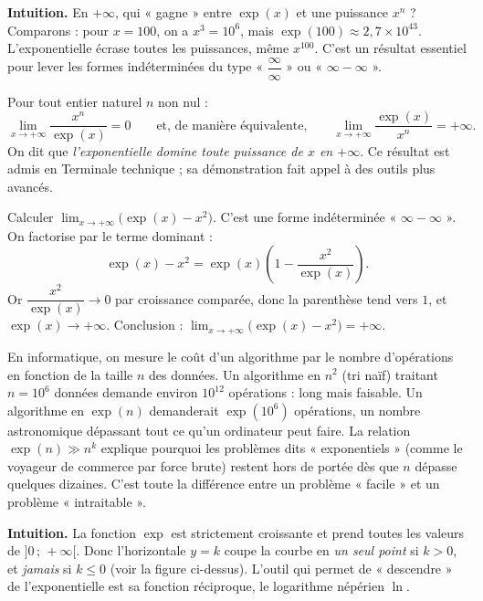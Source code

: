 \documentclass[11pt]{article}
\newcounter{popsec}
\newcounter{popsub}
\newcommand{\courssub}[1]{%
  \stepcounter{popsub}%
  \par\vspace{9pt}\noindent{\popxbold\fontsize{11.5}{13}\selectfont\color{popink}{\color{poporange}\thepopsec.\thepopsub}\hspace{6pt}#1}\par\nopagebreak\vspace{4pt}
}
\begin{document}
\textbf{Intuition.} En $+\infty$, qui « gagne » entre $\exp(x)$ et une puissance $x^n$ ? Comparons : pour $x = 100$, on a $x^3 = 10^{6}$, mais $\exp(100) \approx 2,7 \times 10^{43}$. L'exponentielle écrase toutes les puissances, même $x^{100}$. C'est un résultat essentiel pour lever les formes indéterminées du type « $\dfrac{\infty}{\infty}$ » ou « $\infty - \infty$ ».

\begin{propriete}
Pour tout entier naturel $n$ non nul :
\[
\lim_{x \to +\infty} \frac{x^n}{\exp(x)} = 0 \qquad \text{et, de manière équivalente,} \qquad \lim_{x \to +\infty} \frac{\exp(x)}{x^n} = +\infty.
\]
On dit que \emph{l'exponentielle domine toute puissance de $x$ en $+\infty$}. Ce résultat est admis en Terminale technique ; sa démonstration fait appel à des outils plus avancés.
\end{propriete}

\begin{exemplebox}
Calculer $\displaystyle\lim_{x \to +\infty} \bigl(\exp(x) - x^2\bigr)$. C'est une forme indéterminée « $\infty - \infty$ ». On factorise par le terme dominant :
\[
\exp(x) - x^2 = \exp(x)\left(1 - \frac{x^2}{\exp(x)}\right).
\]
Or $\dfrac{x^2}{\exp(x)} \to 0$ par croissance comparée, donc la parenthèse tend vers $1$, et $\exp(x) \to +\infty$. Conclusion : $\displaystyle\lim_{x \to +\infty} \bigl(\exp(x) - x^2\bigr) = +\infty$.
\end{exemplebox}

\begin{savaistu}
En informatique, on mesure le coût d'un algorithme par le nombre d'opérations en fonction de la taille $n$ des données. Un algorithme en $n^2$ (tri naïf) traitant $n = 10^{6}$ données demande environ $10^{12}$ opérations : long mais faisable. Un algorithme en $\exp(n)$ demanderait $\exp(10^{6})$ opérations, un nombre astronomique dépassant tout ce qu'un ordinateur peut faire. La relation $\exp(n) \gg n^k$ explique pourquoi les problèmes dits « exponentiels » (comme le voyageur de commerce par force brute) restent hors de portée dès que $n$ dépasse quelques dizaines. C'est toute la différence entre un problème « facile » et un problème « intraitable ».
\end{savaistu}

\courssub{Résolution d'équations du type $\exp(u(x)) = k$}

\textbf{Intuition.} La fonction $\exp$ est strictement croissante et prend toutes les valeurs de $]0\,;\,+\infty[$. Donc l'horizontale $y = k$ coupe la courbe en \emph{un seul point} si $k > 0$, et \emph{jamais} si $k \leq 0$ (voir la figure ci-dessus). L'outil qui permet de « descendre » de l'exponentielle est sa fonction réciproque, le logarithme népérien $\ln$.
\end{document}
